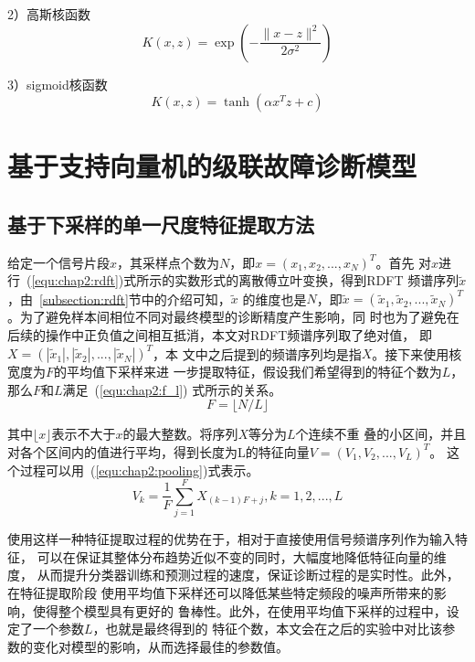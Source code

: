 2）高斯核函数
\begin{equation}
  \label{equ:chap2:gauss_kernel}
  K(x,z)=\exp\left(-\frac{\|x-z\|^2}{2\sigma^2}\right)
\end{equation}

3）sigmoid核函数
\begin{equation}
  \label{equ:chap2:sigmoid_kernel}
  K(x,z)=\tanh(\alpha x^Tz+c)
\end{equation}

\section{基于支持向量机的级联故障诊断模型}

\subsection{基于下采样的单一尺度特征提取方法}

给定一个信号片段$x$，其采样点个数为$N$，即$x=(x_1,x_2,...,x_N)^T$。首先
对$x$进行~(\ref{equ:chap2:rdft})式所示的实数形式的离散傅立叶变换，得到RDFT
频谱序列$\widetilde{x}$，由~\ref{subsection:rdft}节中的介绍可知，$\widetilde{x}$
的维度也是$N$，即$\widetilde{x} = (\widetilde{x}_1, \widetilde{x}_2, ...,
\widetilde{x}_N)^T$。为了避免样本间相位不同对最终模型的诊断精度产生影响，同
时也为了避免在后续的操作中正负值之间相互抵消，本文对RDFT频谱序列取了绝对值，
即$X = (|\widetilde{x}_1|, |\widetilde{x}_2|, ..., |\widetilde{x}_N|)^T$，本
文中之后提到的频谱序列均是指$X$。接下来使用核宽度为$F$的平均值下采样来进
一步提取特征，假设我们希望得到的特征个数为$L$，那么$F$和$L$满足~(\ref{equ:chap2:f_l})
式所示的关系。
\begin{equation}
  \label{equ:chap2:f_l}
  F=\lfloor N/L \rfloor
\end{equation}

其中$\lfloor x \rfloor$表示不大于$x$的最大整数。将序列$X$等分为$L$个连续不重
叠的小区间，并且对各个区间内的值进行平均，得到长度为L的特征向量$V=(V_1,V_2,...,V_L)^T$。
这个过程可以用~(\ref{equ:chap2:pooling})式表示。
\begin{equation}
  \label{equ:chap2:pooling}
  V_k=\frac{1}{F}\sum_{j=1}^{F}X_{(k-1)F+j}, k=1,2,...,L
\end{equation}

使用这样一种特征提取过程的优势在于，相对于直接使用信号频谱序列作为输入特征，
可以在保证其整体分布趋势近似不变的同时，大幅度地降低特征向量的维度，
从而提升分类器训练和预测过程的速度，保证诊断过程的是实时性。此外，在特征提取阶段
使用平均值下采样还可以降低某些特定频段的噪声所带来的影响，使得整个模型具有更好的
鲁棒性。此外，在使用平均值下采样的过程中，设定了一个参数$L$，也就是最终得到的
特征个数，本文会在之后的实验中对比该参数的变化对模型的影响，从而选择最佳的参数值。

